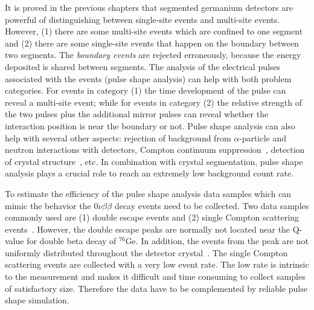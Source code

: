 It is proved in the previous chapters that segmented germanium detectors are powerful of distinguishing between single-site events and multi-site events. However, (1) there are some multi-site events which are confined to one segment and (2) there are some single-site events that happen on the boundary between two segments. The \textit{boundary events} are rejected erroneously, because the energy deposited is shared between segments. The analysis of the electrical pulses associated with the events (pulse shape analysis) can help with both problem categories. For events in category (1) the time development of the pulse can reveal a multi-site event; while for events in category (2) the relative strength of the two pulses plus the additional mirror pulses can reveal whether the interaction position is near the boundary or not. Pulse shape analysis can also help with several other aspects: rejection of background from $\alpha$-particle and neutron interactions with detectors, Compton continuum suppression~\cite{comcon}, detection of crystal structure~\cite{agata}, etc. In combination with crystal segmentation, pulse shape analysis plays a crucial role to reach an extremely low background count rate.

To estimate the efficiency of the pulse shape analysis data samples which can mimic the behavior the $0\nu\beta\beta$ decay events need to be collected. Two data samples commonly used are (1) double escape events and (2) single Compton scattering events~\cite{scoms}. However,
the double escape peaks are normally not located near the Q-value for double beta decay of $^{76}$Ge. In addition, the events from the peak are not uniformly distributed throughout the detector crystal~\cite{major}. The single Compton scattering events are collected with a very low event rate. The low rate is intrinsic to the measurement and makes it difficult and time consuming to collect samples of satisfactory size. Therefore the data have to be complemented by reliable pulse shape simulation.

